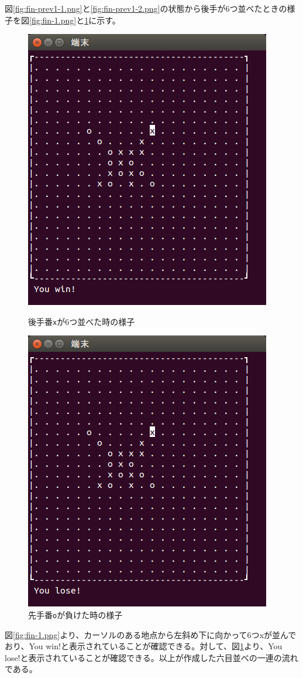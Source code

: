 \documentclass[a4j, titlepage, 10pt]{jsarticle}
\newcommand{\code}[1]{\texttt{#1}}
\begin{document}
図\ref{fig:fin-prev1-1.png}と\ref{fig:fin-prev1-2.png}の状態から後手が6つ並べたときの様子を図\ref{fig:fin-1.png}と\ref{fig:fin-2.png}に示す。
\begin{figure}[H]
  \begin{minipage}{0.5\hsize}
    \centering
    \includegraphics[scale=0.5]{img/fin-1.png}
    \caption{後手番\code{x}が6つ並べた時の様子}
    \label{fig:fin-1.png}
  \end{minipage}
  \begin{minipage}{0.5\hsize}
    \includegraphics[scale=0.5]{img/fin-2.png}
    \caption{先手番\code{o}が負けた時の様子}
    \label{fig:fin-2.png}
  \end{minipage}
\end{figure}
図\ref{fig:fin-1.png}より、カーソルのある地点から左斜め下に向かって6つ{\ttfamily x}が並んでおり、{\ttfamily You win!}と表示されていることが確認できる。対して、図\ref{fig:fin-2.png}より、{\ttfamily You lose!}と表示されていることが確認できる。以上が作成した六目並べの一連の流れである。
\end{document}
